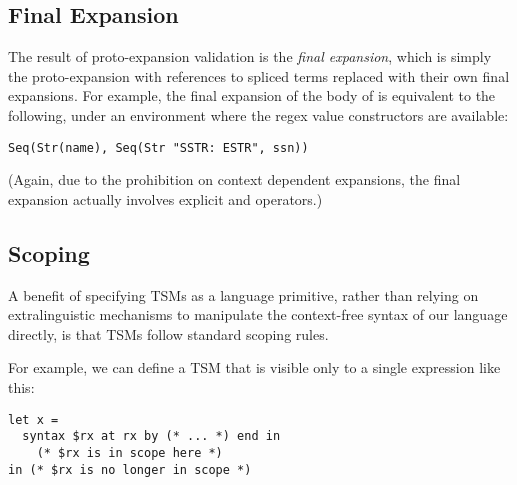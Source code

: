 

\subsection{Final Expansion}
The result of proto-expansion validation is the \emph{final expansion}, which is simply the proto-expansion with  references to spliced terms replaced with their own final expansions. For example, the final expansion of the body of  is equivalent to the following, under an environment where the regex value constructors are available:
\begin{lstlisting}[numbers=none]
Seq(Str(name), Seq(Str "SSTR: ESTR", ssn))
\end{lstlisting}
(Again, due to the prohibition on context dependent expansions, the final expansion actually involves explicit  and  operators.)

\subsection{Scoping}
A benefit of specifying TSMs as a language primitive, rather than relying on extralinguistic mechanisms to manipulate the context-free syntax of our language directly, is that TSMs follow standard scoping rules.

For example, we can define a TSM that is visible only to a single expression like this:
\begin{lstlisting}[numbers=none]
let x = 
  syntax $rx at rx by (* ... *) end in 
    (* $rx is in scope here *) 
in (* $rx is no longer in scope *)
\end{lstlisting}

